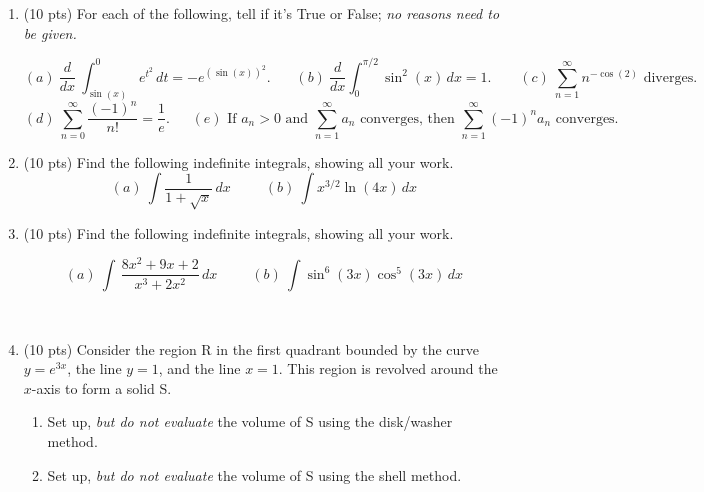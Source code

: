 \documentclass[12pt, oneside]{article}   	%
\title{}
\author{MATH1103   \ \ \ \ \ \ Final Exam A \ \ \ \  December 18, 2021 \\  \\ Closed book, closed notes; show all your work.}
\date{}							%
\begin{document}
\maketitle
\begin{enumerate}



\item (10 pts) For each of the following, tell if it's True or False; \emph{no reasons need to be given.}

$$(a) \ \dfrac{d}{dx} \ \int_{\sin(x)}^{0} e^{t^2} \, dt= -e^{(\sin(x))^2}. \ \ \ \ \ \ \ \  (b) \ \dfrac{d}{dx} \int_0^{\pi/2} \sin^2(x) \, dx=1.  \ \ \ \ \ \ \ \ \ (c) \ \sum_{n=1}^{\infty}  n^{-\cos(2)} \textrm{ diverges.}$$
$$  (d) \ \sum_{n=0}^{\infty} \dfrac{(-1)^n}{n!} = \dfrac{1}{e}. \ \ \ \ \ \ \  (e) \textrm{ If } a_n>0 \textrm{ and } \sum_{n=1}^{\infty} a_n \textrm{ converges, then } \sum_{n=1}^{\infty} (-1)^n a_n \textrm{ converges.}$$




\item (10 pts)  Find the following indefinite integrals, showing all your work.
$$(a) \ \int \dfrac{1}{1+ \sqrt{x}} \, dx \ \ \ \ \ \ \ \ \ \ \ (b) \ \int x^{3/2}\ln(4x) \, dx $$


\item (10 pts)  Find the following indefinite integrals, showing all your work.

$$ (a) \ \int \, \dfrac{8x^2+9x+2}{x^3+2x^2} \, dx \ \ \ \ \ \ \ \ \ \ \ (b) \ \int \sin^6(3x) \cos^5(3x) \, dx$$

\

\item   (10 pts) Consider the region R in the first quadrant bounded by the curve $y=e^{3x}$, the line $y=1$, and the line $x=1$.  This region is revolved around the $x$-axis to form a solid S.

\begin{enumerate}
\item Set up, \emph{but do not evaluate} the volume of S using the disk/washer method.



\item Set up, \emph{but do not evaluate} the volume of S using the shell method.


\end{enumerate}
\end{enumerate}
\end{document}
